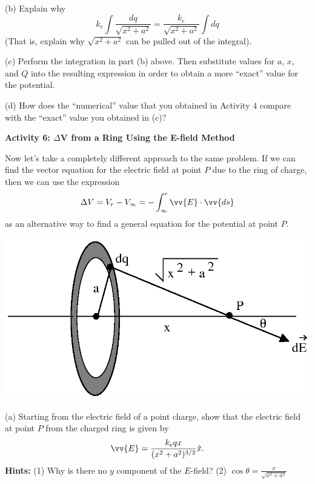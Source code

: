 (b) Explain why
\begin{displaymath}
 k_e\int \frac{dq}{\sqrt{x^{2}+a^{2}}}=\frac{k_e}{\sqrt{x^{2}+a^{2}}}\int dq
\end{displaymath}
(That is, explain why $\sqrt{x^{2}+a^{2}}$ can be pulled out of the integral).
\answerspace{20mm}

(c) Perform the integration in part (b) above. Then substitute values
for $a$, $x$, and $Q$ into the resulting expression in order to obtain a
more {}``exact'' value for the potential.
\answerspace{25mm}

(d) How does the {}``numerical'' value that you obtained in Activity
4 compare with the {}``exact'' value you obtained in (c)?
\answerspace{10mm}

\pagebreak[2]
\textbf{Activity 6: \( \Delta  \)V from a Ring Using the E-field Method}

Now let's take a completely different approach to the same problem.
If we can find the vector equation for the electric field at point
$P$ due to the ring of charge, then we can use the expression
\begin{equation}
\Delta V=V_{r}-V_{\infty }=-\int ^{r}_{\infty }\vv{E}\cdot \vv{ds} 
\end{equation}
as an alternative way to find a general equation for the potential
at point $P$.

{\centering \includegraphics[scale=0.8]{electric_potential/electric_potential_fig_6.eps} \par}


(a) Starting from the electric field of a point charge, show that
the electric field at point $P$ from the charged ring is given by
\begin{equation*}
\vv{E}=\frac{k_eqx}{(x^{2}+a^{2})^{3/2}}\hat{x} .
\end{equation*}
\textbf{Hints:} (1) Why is there no $y$ component of the $E$-field? (2)
$\cos \theta =\frac{x}{\sqrt{x^{2}+a^{2}}}$
\answerspace{30mm}

